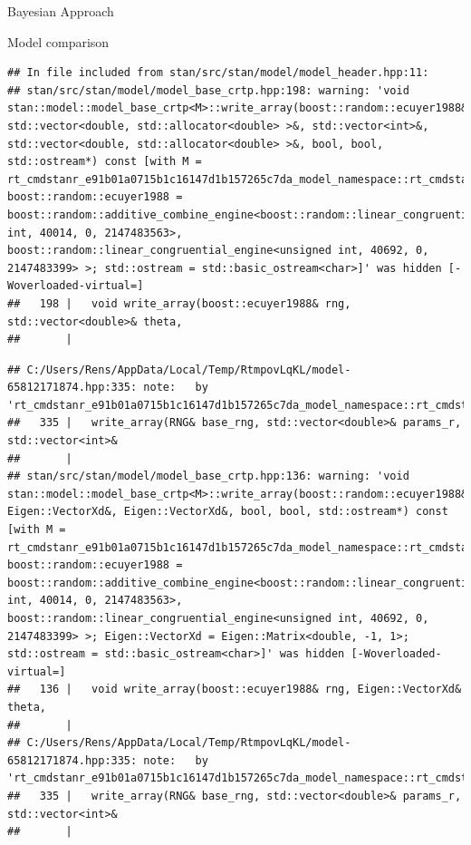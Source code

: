 \documentclass[
  ignorenonframetext,
]{beamer}
\begin{document}
\begin{frame}[fragile]{Bayesian Approach}
\begin{block}{Model comparison}
\begin{verbatim}
## In file included from stan/src/stan/model/model_header.hpp:11:
## stan/src/stan/model/model_base_crtp.hpp:198: warning: 'void stan::model::model_base_crtp<M>::write_array(boost::random::ecuyer1988&, std::vector<double, std::allocator<double> >&, std::vector<int>&, std::vector<double, std::allocator<double> >&, bool, bool, std::ostream*) const [with M = rt_cmdstanr_e91b01a0715b1c16147d1b157265c7da_model_namespace::rt_cmdstanr_e91b01a0715b1c16147d1b157265c7da_model; boost::random::ecuyer1988 = boost::random::additive_combine_engine<boost::random::linear_congruential_engine<unsigned int, 40014, 0, 2147483563>, boost::random::linear_congruential_engine<unsigned int, 40692, 0, 2147483399> >; std::ostream = std::basic_ostream<char>]' was hidden [-Woverloaded-virtual=]
##   198 |   void write_array(boost::ecuyer1988& rng, std::vector<double>& theta,
##       |
\end{verbatim}

\begin{verbatim}
## C:/Users/Rens/AppData/Local/Temp/RtmpovLqKL/model-65812171874.hpp:335: note:   by 'rt_cmdstanr_e91b01a0715b1c16147d1b157265c7da_model_namespace::rt_cmdstanr_e91b01a0715b1c16147d1b157265c7da_model::write_array'
##   335 |   write_array(RNG& base_rng, std::vector<double>& params_r, std::vector<int>&
##       | 
## stan/src/stan/model/model_base_crtp.hpp:136: warning: 'void stan::model::model_base_crtp<M>::write_array(boost::random::ecuyer1988&, Eigen::VectorXd&, Eigen::VectorXd&, bool, bool, std::ostream*) const [with M = rt_cmdstanr_e91b01a0715b1c16147d1b157265c7da_model_namespace::rt_cmdstanr_e91b01a0715b1c16147d1b157265c7da_model; boost::random::ecuyer1988 = boost::random::additive_combine_engine<boost::random::linear_congruential_engine<unsigned int, 40014, 0, 2147483563>, boost::random::linear_congruential_engine<unsigned int, 40692, 0, 2147483399> >; Eigen::VectorXd = Eigen::Matrix<double, -1, 1>; std::ostream = std::basic_ostream<char>]' was hidden [-Woverloaded-virtual=]
##   136 |   void write_array(boost::ecuyer1988& rng, Eigen::VectorXd& theta,
##       | 
## C:/Users/Rens/AppData/Local/Temp/RtmpovLqKL/model-65812171874.hpp:335: note:   by 'rt_cmdstanr_e91b01a0715b1c16147d1b157265c7da_model_namespace::rt_cmdstanr_e91b01a0715b1c16147d1b157265c7da_model::write_array'
##   335 |   write_array(RNG& base_rng, std::vector<double>& params_r, std::vector<int>&
##       |
\end{verbatim}


\end{block}
\end{frame}
\end{document}
